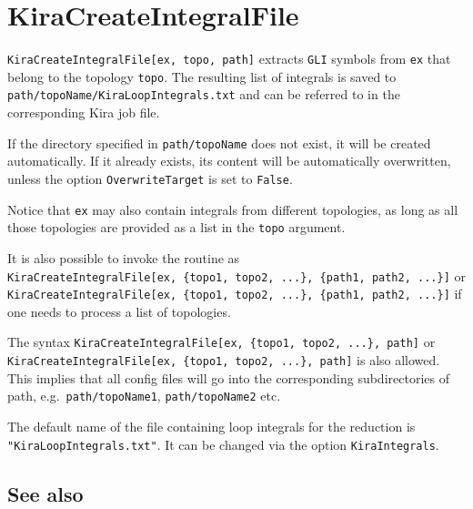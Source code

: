 \documentclass[../FeynHelpersManual.tex]{subfiles}
\begin{document}
\hypertarget{kiracreateintegralfile}{
\section{KiraCreateIntegralFile}\label{kiracreateintegralfile}}

\texttt{KiraCreateIntegralFile[\allowbreak{}ex,\ \allowbreak{}topo,\ \allowbreak{}path]}
extracts \texttt{GLI} symbols from \texttt{ex} that belong to the
topology \texttt{topo}. The resulting list of integrals is saved to
\texttt{path/topoName/KiraLoopIntegrals.txt} and can be referred to in
the corresponding Kira job file.

If the directory specified in \texttt{path/topoName} does not exist, it
will be created automatically. If it already exists, its content will be
automatically overwritten, unless the option \texttt{OverwriteTarget} is
set to \texttt{False}.

Notice that \texttt{ex} may also contain integrals from different
topologies, as long as all those topologies are provided as a list in
the \texttt{topo} argument.

It is also possible to invoke the routine as
\texttt{KiraCreateIntegralFile[\allowbreak{}ex,\ \allowbreak{}\{\allowbreak{}topo1,\ \allowbreak{}topo2,\ \allowbreak{}...\},\ \allowbreak{}\{\allowbreak{}path1,\ \allowbreak{}path2,\ \allowbreak{}...\}]}
or
\texttt{KiraCreateIntegralFile[\allowbreak{}ex,\ \allowbreak{}\{\allowbreak{}topo1,\ \allowbreak{}topo2,\ \allowbreak{}...\},\ \allowbreak{}\{\allowbreak{}path1,\ \allowbreak{}path2,\ \allowbreak{}...\}]}
if one needs to process a list of topologies.

The syntax
\texttt{KiraCreateIntegralFile[\allowbreak{}ex,\ \allowbreak{}\{\allowbreak{}topo1,\ \allowbreak{}topo2,\ \allowbreak{}...\},\ \allowbreak{}path]}
or
\texttt{KiraCreateIntegralFile[\allowbreak{}ex,\ \allowbreak{}\{\allowbreak{}topo1,\ \allowbreak{}topo2,\ \allowbreak{}...\},\ \allowbreak{}path]}
is also allowed. This implies that all config files will go into the
corresponding subdirectories of path, e.g.~\texttt{path/topoName1},
\texttt{path/topoName2} etc.

The default name of the file containing loop integrals for the reduction
is \texttt{"KiraLoopIntegrals.txt"}. It can be changed via the option
\texttt{KiraIntegrals}.

\subsection{See also}
\end{document}
